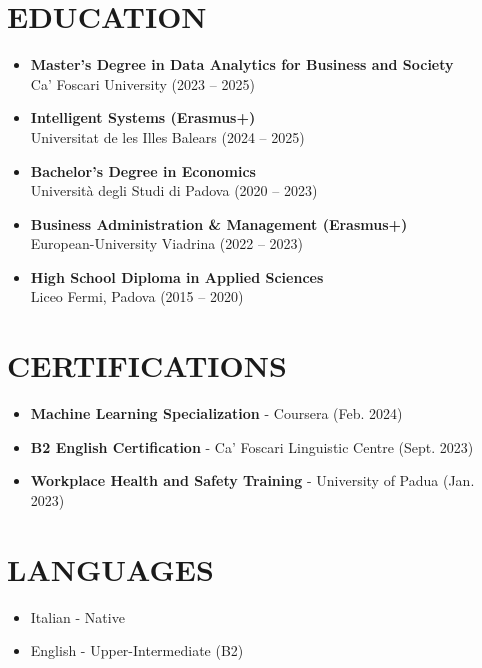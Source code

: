 \documentclass[a4paper,10pt]{article}
\begin{document}
\section*{EDUCATION}
\begin{itemize}[leftmargin=*, label={$\bullet$}]
    \item \textbf{Master's Degree in Data Analytics for Business and Society} \\
          Ca' Foscari University (2023 -- 2025)
    \item \textbf{Intelligent Systems (Erasmus+)} \\
          Universitat de les Illes Balears (2024 -- 2025)
    \item \textbf{Bachelor's Degree in Economics} \\
          Università degli Studi di Padova (2020 -- 2023)
    \item \textbf{Business Administration \& Management (Erasmus+)} \\
          European-University Viadrina (2022 -- 2023)
    \item \textbf{High School Diploma in Applied Sciences} \\
          Liceo Fermi, Padova (2015 -- 2020)
\end{itemize}

\section*{CERTIFICATIONS}
\begin{itemize}[leftmargin=*, label={$\bullet$}]
    \item \textbf{Machine Learning Specialization} - Coursera (Feb. 2024)
    \item \textbf{B2 English Certification} - Ca' Foscari Linguistic Centre (Sept. 2023)
    \item \textbf{Workplace Health and Safety Training} - University of Padua (Jan. 2023)
\end{itemize}

\section*{LANGUAGES}
\begin{itemize}[leftmargin=*, label={$\bullet$}]
    \item Italian - Native
    \item English - Upper-Intermediate (B2)
\end{itemize}
\end{document}
